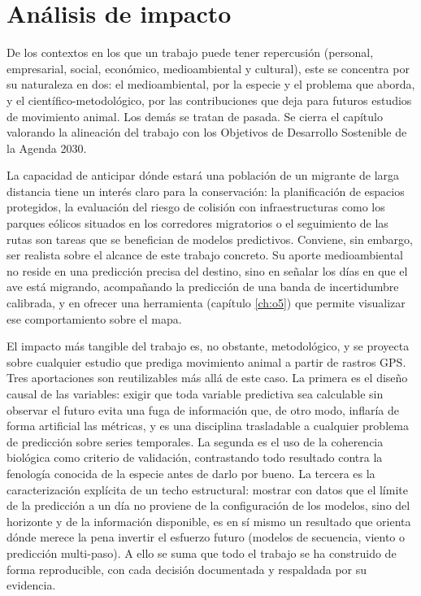 \chapter{Análisis de impacto}
\label{ch:impacto}

De los contextos en los que un trabajo puede tener repercusión (personal,
empresarial, social, económico, medioambiental y cultural), este se concentra
por su naturaleza en dos: el medioambiental, por la especie y el problema que
aborda, y el científico-metodológico, por las contribuciones que deja para
futuros estudios de movimiento animal. Los demás se tratan de pasada. Se cierra
el capítulo valorando la alineación del trabajo con los Objetivos de Desarrollo
Sostenible de la Agenda 2030.

La capacidad de anticipar dónde estará una población de un migrante de larga
distancia tiene un interés claro para la conservación: la planificación de
espacios protegidos, la evaluación del riesgo de colisión con infraestructuras
como los parques eólicos situados en los corredores migratorios o el seguimiento
de las rutas son tareas que se benefician de modelos predictivos. Conviene, sin
embargo, ser realista sobre el alcance de este trabajo concreto. Su aporte
medioambiental no reside en una predicción precisa del destino, sino en señalar los
días en que el ave está migrando, acompañando la predicción de una banda de
incertidumbre calibrada, y en ofrecer una herramienta (capítulo \ref{ch:o5}) que
permite visualizar ese comportamiento sobre el mapa.

El impacto más tangible del trabajo es, no obstante, metodológico, y se proyecta
sobre cualquier estudio que prediga movimiento animal a partir de rastros GPS.
Tres aportaciones son reutilizables más allá de este caso. La primera es el
diseño causal de las variables: exigir que toda variable predictiva sea
calculable sin observar el futuro evita una fuga de información que, de otro modo,
inflaría de forma artificial las métricas, y es una disciplina trasladable a
cualquier problema de predicción sobre series temporales. La segunda es el uso de
la coherencia biológica como criterio de validación, contrastando todo resultado
contra la fenología conocida de la especie antes de darlo por bueno. La tercera es
la caracterización explícita de un techo estructural: mostrar con datos que el límite
de la predicción a un día no proviene de la configuración de los modelos, sino del
horizonte y de la información disponible, es en sí mismo un resultado que orienta
dónde merece la pena invertir el esfuerzo futuro (modelos de secuencia, viento o
predicción multi-paso). A ello se suma que todo el trabajo se ha construido de
forma reproducible, con cada decisión documentada y respaldada por su evidencia.

